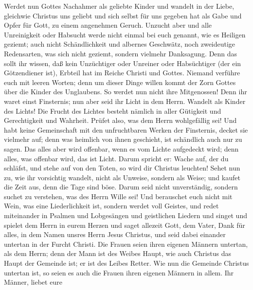  Werdet nun Gottes Nachahmer als geliebte Kinder
 und wandelt in der Liebe, gleichwie Christus uns geliebt
und sich selbst für uns gegeben hat als Gabe und Opfer für Gott, zu
einem angenehmen Geruch.  Unzucht aber und alle
Unreinigkeit oder Habsucht werde nicht einmal bei euch genannt, wie es
Heiligen geziemt;  auch nicht Schändlichkeit und albernes
Geschwätz, noch zweideutige Redensarten, was sich nicht geziemt, sondern
vielmehr Danksagung.  Denn das sollt ihr wissen, daß kein
Unzüchtiger oder Unreiner oder Habsüchtiger (der ein Götzendiener ist),
Erbteil hat im Reiche Christi und Gottes.  Niemand
verführe euch mit leeren Worten; denn um dieser Dinge willen kommt der
Zorn Gottes über die Kinder des Unglaubens.  So werdet nun
nicht ihre Mitgenossen!  Denn ihr waret einst Finsternis;
nun aber seid ihr Licht in dem Herrn. Wandelt als Kinder des Lichts!
 Die Frucht des Lichtes besteht nämlich in aller Gütigkeit
und Gerechtigkeit und Wahrheit.  Prüfet also, was dem
Herrn wohlgefällig sei!  Und habt keine Gemeinschaft mit
den unfruchtbaren Werken der Finsternis, decket sie vielmehr auf;
 denn was heimlich von ihnen geschieht, ist schändlich
auch nur zu sagen.  Das alles aber wird offenbar, wenn es
vom Lichte aufgedeckt wird; denn alles, was offenbar wird, das ist
Licht.  Darum spricht er: Wache auf, der du schläfst, und
stehe auf von den Toten, so wird dir Christus leuchten! 
Sehet nun zu, wie ihr vorsichtig wandelt, nicht als Unweise, sondern als
Weise;  und kaufet die Zeit aus, denn die Tage sind böse.
 Darum seid nicht unverständig, sondern suchet zu
verstehen, was des Herrn Wille sei!  Und berauschet euch
nicht mit Wein, was eine Liederlichkeit ist, sondern werdet voll
Geistes,  und redet miteinander in Psalmen und
Lobgesängen und geistlichen Liedern und singet und spielet dem Herrn in
eurem Herzen  und saget allezeit Gott, dem Vater, Dank
für alles, in dem Namen unsres Herrn Jesus Christus,  und
seid dabei einander untertan in der Furcht Christi.  Die
Frauen seien ihren eigenen Männern untertan, als dem Herrn;
 denn der Mann ist des Weibes Haupt, wie auch Christus
das Haupt der Gemeinde ist; er ist des Leibes Retter. 
Wie nun die Gemeinde Christus untertan ist, so seien es auch die Frauen
ihren eigenen Männern in allem.  Ihr Männer, liebet eure
